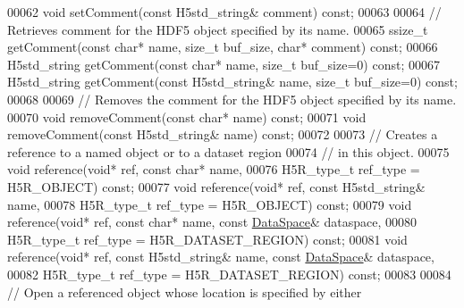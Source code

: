 \begin{DoxyCode}
00062         \textcolor{keywordtype}{void} setComment(\textcolor{keyword}{const} H5std\_string& comment) \textcolor{keyword}{const};
00063 
00064         \textcolor{comment}{// Retrieves comment for the HDF5 object specified by its name.}
00065         ssize\_t getComment(\textcolor{keyword}{const} \textcolor{keywordtype}{char}* name, \textcolor{keywordtype}{size\_t} buf\_size, \textcolor{keywordtype}{char}* comment) \textcolor{keyword}{const};
00066         H5std\_string getComment(\textcolor{keyword}{const} \textcolor{keywordtype}{char}* name, \textcolor{keywordtype}{size\_t} buf\_size=0) \textcolor{keyword}{const};
00067         H5std\_string getComment(\textcolor{keyword}{const} H5std\_string& name, \textcolor{keywordtype}{size\_t} buf\_size=0) \textcolor{keyword}{const};
00068 
00069         \textcolor{comment}{// Removes the comment for the HDF5 object specified by its name.}
00070         \textcolor{keywordtype}{void} removeComment(\textcolor{keyword}{const} \textcolor{keywordtype}{char}* name) \textcolor{keyword}{const};
00071         \textcolor{keywordtype}{void} removeComment(\textcolor{keyword}{const} H5std\_string& name) \textcolor{keyword}{const};
00072 
00073         \textcolor{comment}{// Creates a reference to a named object or to a dataset region}
00074         \textcolor{comment}{// in this object.}
00075         \textcolor{keywordtype}{void} reference(\textcolor{keywordtype}{void}* ref, \textcolor{keyword}{const} \textcolor{keywordtype}{char}* name, 
00076                         H5R\_type\_t ref\_type = H5R\_OBJECT) \textcolor{keyword}{const};
00077         \textcolor{keywordtype}{void} reference(\textcolor{keywordtype}{void}* ref, \textcolor{keyword}{const} H5std\_string& name,
00078                         H5R\_type\_t ref\_type = H5R\_OBJECT) \textcolor{keyword}{const};
00079         \textcolor{keywordtype}{void} reference(\textcolor{keywordtype}{void}* ref, \textcolor{keyword}{const} \textcolor{keywordtype}{char}* name, \textcolor{keyword}{const} \hyperlink{class_h5_1_1_data_space}{DataSpace}& dataspace,
00080                         H5R\_type\_t ref\_type = H5R\_DATASET\_REGION) \textcolor{keyword}{const};
00081         \textcolor{keywordtype}{void} reference(\textcolor{keywordtype}{void}* ref, \textcolor{keyword}{const} H5std\_string& name, \textcolor{keyword}{const} \hyperlink{class_h5_1_1_data_space}{DataSpace}& dataspace,
00082                         H5R\_type\_t ref\_type = H5R\_DATASET\_REGION) \textcolor{keyword}{const};
00083 
00084         \textcolor{comment}{// Open a referenced object whose location is specified by either}

\end{DoxyCode}
